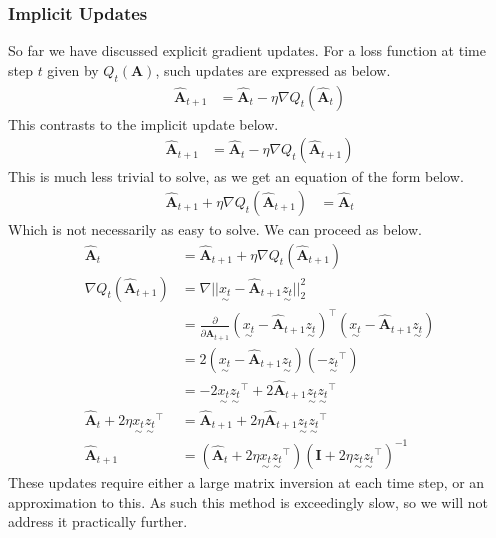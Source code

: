 \documentclass[12pt,a4paper]{article} %
\newcommand{\ve}[1]{\underset{\sim}{#1}}
\begin{document}
\subsubsection{Implicit Updates}
So far we have discussed explicit gradient updates. For a loss function at time step $t$ given by $Q_t(\pmb{A})$, such updates are expressed as below.
\begin{align*}
    \hat{\pmb{A}}_{t+1}&=\hat{\pmb{A}}_{t}-\eta\nabla Q_t(\hat{\pmb{A}}_{t})
\end{align*}
This contrasts to the implicit update below.
\begin{align*}
    \hat{\pmb{A}}_{t+1}&=\hat{\pmb{A}}_{t}-\eta\nabla Q_t(\hat{\pmb{A}}_{t+1})
\end{align*}
This is much less trivial to solve, as we get an equation of the form below.
\begin{align*}
    \hat{\pmb{A}}_{t+1}+\eta\nabla Q_t(\hat{\pmb{A}}_{t+1})&=\hat{\pmb{A}}_{t}
\end{align*}
Which is not necessarily as easy to solve. We can proceed as below.
\begin{align*}
    \hat{\pmb{A}}_{t}&=\hat{\pmb{A}}_{t+1}+\eta\nabla Q_t(\hat{\pmb{A}}_{t+1})\\
    \nabla Q_t(\hat{\pmb{A}}_{t+1})&=\nabla ||\ve{x_t}-\hat{\pmb{A}}_{t+1}\ve{z_t}||_2^2\\
    &=\frac{\partial}{\partial\hat{\pmb{A}}_{t+1}} (\ve{x_t}-\hat{\pmb{A}}_{t+1}\ve{z_t})^\top(\ve{x_t}-\hat{\pmb{A}}_{t+1}\ve{z_t})\\
    &=2(\ve{x_t}-\hat{\pmb{A}}_{t+1}\ve{z_t})(-\ve{z_t}^\top)\\
    &=-2\ve{x_t}\ve{z_t}^\top+2\hat{\pmb{A}}_{t+1}\ve{z_t}\ve{z_t}^\top\\
    \hat{\pmb{A}}_{t}+2\eta\ve{x_t}\ve{z_t}^\top&=\hat{\pmb{A}}_{t+1}+2\eta\hat{\pmb{A}}_{t+1}\ve{z_t}\ve{z_t}^\top\\
    \hat{\pmb{A}}_{t+1}&=(\hat{\pmb{A}}_{t}+2\eta\ve{x_t}\ve{z_t}^\top)(\pmb{I}+2\eta\ve{z_t}\ve{z_t}^\top)^{-1}
\end{align*}
These updates require either a large matrix inversion at each time step, or an approximation to this. As such this method is exceedingly slow, so we will not address it practically further.

\newpage
\end{document}

